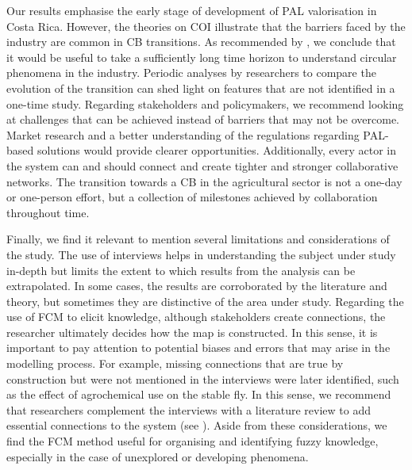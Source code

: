 Our results emphasise the early stage of development of PAL valorisation in Costa Rica. However, the theories on COI illustrate that the barriers faced by the industry are common in CB transitions. As recommended by \cite{blomsma2022making}, we conclude that it would be useful to take a sufficiently long time horizon to understand circular phenomena in the industry. Periodic analyses by researchers to compare the evolution of the transition can shed light on features that are not identified in a one-time study. Regarding stakeholders and policymakers, we recommend looking at challenges that can be achieved instead of barriers that may not be overcome. Market research and a better understanding of the regulations regarding PAL-based solutions would provide clearer opportunities. Additionally, every actor in the system can and should connect and create tighter and stronger collaborative networks. The transition towards a CB in the agricultural sector is not a one-day or one-person effort, but a collection of milestones achieved by collaboration throughout time. 

Finally, we find it relevant to mention several limitations and considerations of the study. The use of interviews helps in understanding the subject under study in-depth but limits the extent to which results from the analysis can be extrapolated. In some cases, the results are corroborated by the literature and theory, but sometimes they are distinctive of the area under study. Regarding the use of FCM to elicit knowledge, although stakeholders create connections, the researcher ultimately decides how the map is constructed. In this sense, it is important to pay attention to potential biases and errors that may arise in the modelling process. For example, missing connections that are true by construction but were not mentioned in the interviews were later identified, such as the effect of agrochemical use on the stable fly. In this sense, we recommend that researchers complement the interviews with a literature review to add essential connections to the system (see \cite{edwards2021building}). Aside from these considerations, we find the FCM method useful for organising and identifying fuzzy knowledge, especially in the case of unexplored or developing phenomena.

